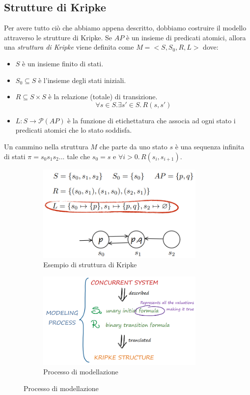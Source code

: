 \documentclass[a4paper,oneside,titlepage]{book}
\begin{document}
\subsection{Strutture di Kripke}
Per avere tutto ciò che abbiamo appena descritto, dobbiamo costruire il modello attraverso le strutture di Kripke. Se $AP$ è un insieme di predicati atomici, allora una \textit{struttura di Kripke} viene definita come $M=<S,S_0,R,L>$ dove:
\begin{itemize}
    \item $S$ è un insieme finito di stati.
    \item $S_0 \subseteq S$ è l'insieme degli stati iniziali.
    \item $R \subseteq S \times S$ è la relazione (totale) di transizione.
    \[ \forall s \in S. \exists s' \in S. \, R(s,s') \]
    \item $L: S \rightarrow \mathcal{P}(AP)$ è la funzione di etichettatura che associa ad ogni stato i predicati atomici che lo stato soddisfa.
\end{itemize}
Un cammino nella struttura $M$ che parte da uno stato $s$ è una sequenza infinita di stati $\pi = s_0 s_1 s_2 ...$ tale che $s_0 = s$ e $\forall i>0. \, R(s_i, s_{i+1})$.
\begin{figure}[htp]
	\begin{subfigure}{0.49\textwidth}
	    \centering
		\includegraphics[width=0.9\textwidth]{kripke1.png}
		\caption{Esempio di struttura di Kripke}
	\end{subfigure}
	\hfill
	\begin{subfigure}{0.49\textwidth}
	    \centering
		\includegraphics[width=0.9\textwidth]{kripke2.png}
		\caption{Processo di modellazione}
	\end{subfigure}
\end{figure}
\end{document}
